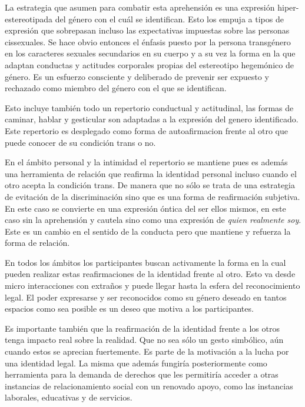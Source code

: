 La estrategia que asumen para combatir esta aprehensión es una expresión
hiper-estereotipada del género con el cuál se identifican. Esto los empuja a
tipos de expresión que sobrepasan incluso las expectativas impuestas sobre las
personas cissexuales. Se hace obvio entonces el énfasis puesto por la persona
transgénero en los caracteres sexuales secundarios en su cuerpo y a su vez la
forma en la que adaptan conductas y actitudes corporales propias del estereotipo
hegemónico de género. Es un esfuerzo consciente y deliberado de prevenir ser
expuesto y rechazado como miembro del género con el que se identifican.

Esto incluye también todo un repertorio conductual y actitudinal, las formas de
caminar, hablar y gesticular son adaptadas a la expresión del genero
identificado. Este repertorio es desplegado como forma de autoafirmacion frente
al otro que puede conocer de su condición trans o no.

En el ámbito personal y la intimidad el repertorio se mantiene pues es además
una herramienta de relación que reafirma la identidad personal incluso cuando el
otro acepta la condición trans. De manera que no sólo se trata de una estrategia
de evitación de la discriminación sino que es una forma de reafirmación
subjetiva. En este caso se convierte en una expresión óntica del ser ellos
mismos, en este caso sin la aprehensión y cautela sino como una expresión de
\emph{quien realmente soy}. Este es un cambio en el sentido de la conducta pero
que mantiene y refuerza la forma de relación.

En todos los ámbitos los participantes buscan activamente la forma en la cual
pueden realizar estas reafirmaciones de la identidad frente al otro. Esto va
desde micro interacciones con extraños y puede llegar hasta la esfera del
reconocimiento legal. El poder expresarse y ser reconocidos como su género
deseado en tantos espacios como sea posible es un deseo que motiva a los
participantes.

Es importante también que la reafirmación de la identidad frente a los otros
tenga impacto real sobre la realidad. Que no sea sólo un gesto simbólico, aún
cuando estos se aprecian fuertemente. Es parte de la motivación a la lucha por
una identidad legal. La misma que además fungiría posteriormente como
herramienta para la demanda de derechos que les permitiría acceder a otras
instancias de relacionamiento social con un renovado apoyo, como las instancias
laborales, educativas y de servicios.
